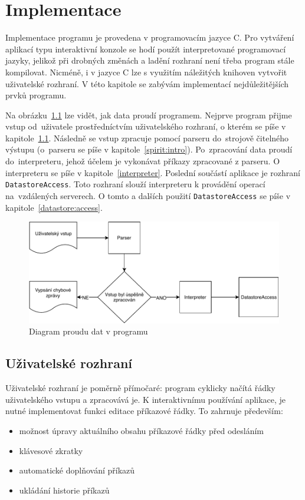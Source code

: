 \documentclass[thesis=B,czech,hidelinks]{FITthesis}[2019/03/06]
\newcommand{\Rplus}{\protect\hspace{-.1em}\protect\raisebox{.35ex}{\smaller{\smaller\textbf{+}}}}
\newcommand{\Cpp}{\mbox{C\Rplus\Rplus}\xspace}
\begin{document}
\chapter{Implementace}
Implementace programu je provedena v programovacím jazyce \Cpp{}. Pro vytváření aplikací typu interaktivní konzole se hodí použít interpretované programovací jazyky, jelikož při drobných změnách a ladění rozhraní není třeba program stále kompilovat. Nicméně, i v jazyce \Cpp{} lze s využitím náležitých knihoven vytvořit uživatelské rozhraní. V této kapitole se zabývám implementací nejdůležitějších prvků programu.

Na obrázku~\ref{proud:dat} lze vidět, jak data proudí programem. Nejprve program přijme vstup od~uživatele prostředníctvím uživatelského rozhraní, o kterém se píše v kapitole~\ref{ui}. Následně se vstup zpracuje pomocí parseru do~strojově čitelného výstupu (o~parseru se píše v kapitole~\ref{spirit:intro}). Po~zpracování data proudí do~interpreteru, jehož účelem je vykonávat příkazy zpracované z parseru. O interpreteru se píše v kapitole~\ref{interpreter}. Poslední součástí aplikace je rozhraní \texttt{DatastoreAccess}. Toto rozhraní slouží interpreteru k provádění operací na~vzdálených serverech. O tomto a dalších použití \texttt{DatastoreAccess} se píše v kapitole~\ref{datastore:access}.
\begin{figure}
\begin{center}
\includegraphics[width=.9\textwidth]{diagram}
\end{center}
\caption{Diagram proudu dat v programu}\label{proud:dat}
\end{figure}


\section{Uživatelské rozhraní}\label{ui}
Uživatelské rozhraní je poměrně přímočaré: program cyklicky načítá řádky uživatelského vstupu a zpracovává je. K interaktivnímu používání aplikace, je nutné implementovat funkci editace příkazové řádky. To zahrnuje především:
\begin{itemize}
    \item možnost úpravy aktuálního obsahu příkazové řádky před odesláním
    \item klávesové zkratky
    \item automatické doplňování příkazů
    \item ukládání historie příkazů
\end{itemize}
\end{document}
